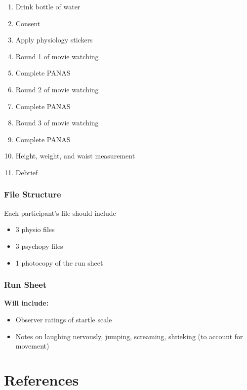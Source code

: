 \documentclass[]{book}
\providecommand{\tightlist}{%
  \setlength{\itemsep}{0pt}\setlength{\parskip}{0pt}}
\begin{document}
\begin{enumerate}
\def\labelenumi{\arabic{enumi}.}
\tightlist
\item
  Drink bottle of water
\item
  Consent
\item
  Apply physiology stickers
\item
  Round 1 of movie watching
\item
  Complete PANAS
\item
  Round 2 of movie watching
\item
  Complete PANAS
\item
  Round 3 of movie watching
\item
  Complete PANAS
\item
  Height, weight, and waist measurement
\item
  Debrief
\end{enumerate}

\hypertarget{file-structure}{%
\subsection{File Structure}\label{file-structure}}

Each participant's file should include

\begin{itemize}
\tightlist
\item
  3 physio files
\item
  3 psychopy files
\item
  1 photocopy of the run sheet
\end{itemize}

\hypertarget{run-sheet}{%
\subsection{Run Sheet}\label{run-sheet}}

\textbf{Will include:}

\begin{itemize}
\tightlist
\item
  Observer ratings of startle scale
\item
  Notes on laughing nervously, jumping, screaming, shrieking (to account for movement)
\end{itemize}

\hypertarget{references}{%
\chapter{References}\label{references}}
\end{document}
